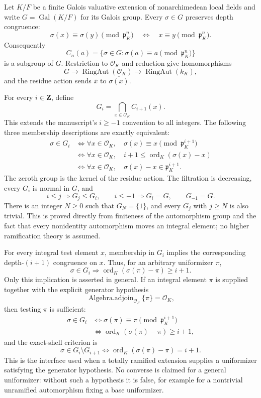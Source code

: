 \begin{definition}\label{mod:ramification-lowergroups}
Let $K/F$ be a finite Galois valuative extension of nonarchimedean local fields
and write $G=\operatorname{Gal}(K/F)$ for its Galois group.  Every
$\sigma\in G$ preserves depth congruence:
\[
 \sigma(x)\equiv\sigma(y)\pmod{\mathfrak p_K^n}
 \quad\Longleftrightarrow\quad
 x\equiv y\pmod{\mathfrak p_K^n}.
\]
Consequently
\[
 C_n(a)=\{\sigma\in G:\sigma(a)\equiv a\pmod{\mathfrak p_K^n}\}
\]
is a subgroup of $G$.  Restriction to $\mathcal O_K$ and reduction give
homomorphisms
\[
 G\longrightarrow\operatorname{RingAut}(\mathcal O_K)
 \longrightarrow\operatorname{RingAut}(k_K),
\]
and the residue action sends $\overline{x}$ to $\overline{\sigma(x)}$.

For every $i\in\mathbf Z$, define
\[
 G_i=\bigcap_{x\in\mathcal O_K}C_{i+1}(x).
\]
This extends the manuscript's $i\geq-1$ convention to all integers.  The
following three membership descriptions are exactly equivalent:
\[
 \begin{aligned}
 \sigma\in G_i
 &\Longleftrightarrow
   \forall x\in\mathcal O_K,\quad
   \sigma(x)\equiv x\pmod{\mathfrak p_K^{i+1}}\\
 &\Longleftrightarrow
   \forall x\in\mathcal O_K,\quad
   i+1\leq\operatorname{ord}_K(\sigma(x)-x)\\
 &\Longleftrightarrow
   \forall x\in\mathcal O_K,\quad
   \sigma(x)-x\in\mathfrak p_K^{i+1}.
 \end{aligned}
\]
The zeroth group is the kernel of the residue action.  The filtration is
decreasing, every $G_i$ is normal in $G$, and
\[
 i\leq j\Longrightarrow G_j\leq G_i,
 \qquad i\leq-1\Longrightarrow G_i=G,
 \qquad G_{-1}=G.
\]
There is an integer $N\geq0$ such that $G_N=\{1\}$, and every $G_j$ with
$j\geq N$ is also trivial.  This is proved directly from finiteness of the
automorphism group and the fact that every nonidentity automorphism moves an
integral element; no higher ramification theory is assumed.

For every integral test element $x$, membership in $G_i$ implies the
corresponding depth-$(i+1)$ congruence on $x$.  Thus, for an arbitrary
uniformizer $\pi$,
\[
 \sigma\in G_i\Longrightarrow
 \operatorname{ord}_K(\sigma(\pi)-\pi)\geq i+1.
\]
Only this implication is asserted in general.  If an integral element $\pi$
is supplied together with the explicit generator hypothesis
\[
 \operatorname{Algebra.adjoin}_{\mathcal O_F}\{\pi\}=\mathcal O_K,
\]
then testing $\pi$ is sufficient:
\[
 \begin{aligned}
 \sigma\in G_i
 &\Longleftrightarrow
 \sigma(\pi)\equiv\pi\pmod{\mathfrak p_K^{i+1}}\\
 &\Longleftrightarrow
 \operatorname{ord}_K(\sigma(\pi)-\pi)\geq i+1,
 \end{aligned}
\]
and the exact-shell criterion is
\[
 \sigma\in G_i\setminus G_{i+1}
 \Longleftrightarrow
 \operatorname{ord}_K(\sigma(\pi)-\pi)=i+1.
\]
This is the interface used when a totally ramified extension supplies a
uniformizer satisfying the generator hypothesis.  No converse is claimed for
a general uniformizer: without such a hypothesis it is false, for example for
a nontrivial unramified automorphism fixing a base uniformizer.


\end{definition}
